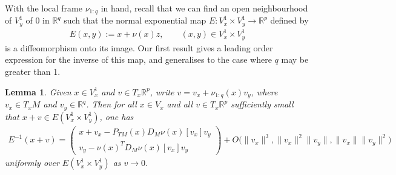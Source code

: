 \documentclass{article}
\newcommand{\RB}{\mathbb{R}}
\theoremstyle{plain}
\newtheorem{lemma}[theorem]{Lemma}
\theoremstyle{definition}
\theoremstyle{remark}
\begin{document}
With the local frame $\nu_{1:q}$ in hand, recall that we can find an open neighbourhood of $V^1_y$ of $0$ in $\RB^q$ such that the normal exponential map $E:V^1_x\times V^1_y\rightarrow\RB^p$ defined by
\begin{align}
E(x,y):=x + \nu(x)z,\qquad (x,y)\in V^1_x\times V^1_y
\end{align}
is a diffeomorphism onto its image. Our first result gives a leading order expression for the inverse of this map, and generalises \cite[Proposition C.3]{macdonaldeos} to the case where $q$ may be greater than 1.

\begin{lemma}\label{lem:Einv}
    Given $x\in V^1_x$ and $v\in T_x\RB^p$, write $v = v_x + \nu_{1:q}(x)v_y$, where $v_x\in T_xM$ and $v_y\in \RB^q$. Then for all $x\in V_x$ and all $v\in T_x\RB^p$ sufficiently small that $x+v\in E(V^1_x\times V^1_y)$, one has
    \begin{align}
    E^{-1}(x + v) = \begin{pmatrix} x + v_x - P_{TM}(x)D_M\nu(x)[v_x]v_y \\ v_y - \nu(x)^TD_M\nu(x)[v_x]v_y\end{pmatrix} + O\big(\|v_x\|^3,\|v_x\|^2\|v_y\|,\|v_x\|\|v_y\|^2\big)
    \end{align}
    uniformly over $E(V^1_x\times V^1_y)$ as $v\rightarrow 0$.
\end{lemma}
\end{document}
